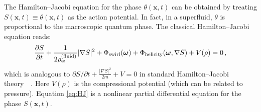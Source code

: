 \documentclass[preprint]{revtex4-2}
\begin{document}
    The Hamilton–Jacobi equation for the phase $\theta(\mathbf{x},t)$ can be obtained by treating $S(\mathbf{x},t) \equiv \theta(\mathbf{x},t)$ as the action potential. In fact, in a superfluid, $\theta$ is proportional to the macroscopic quantum phase. The classical Hamilton–Jacobi equation reads:
    \begin{equation}
        \frac{\partial S}{\partial t} + \frac{1}{2\rho_{\text{\ae}}^{(\text{fluid})}} |\nabla S|^2 + \Phi_{\rm swirl}(\boldsymbol{\omega}) + \Phi_{\rm helicity}(\boldsymbol{\omega},\nabla S) + V(\rho) = 0\,,
        \label{eq:HJ}
    \end{equation}
    which is analogous to $\partial S/\partial t + \frac{|\nabla S|^2}{2m}+V=0$ in standard Hamilton–Jacobi theory~\cite{reference_65}~\cite{reference_66}. Here $V(\rho)$ is the compressional potential (which can be related to pressure). Equation \eqref{eq:HJ} is a nonlinear partial differential equation for the phase $S(\mathbf{x},t)$.
\end{document}
